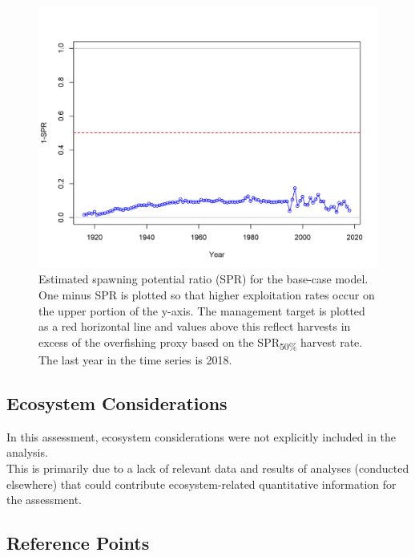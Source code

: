 \documentclass[12pt,]{article}
\begin{document}
\begin{figure}
\centering
\includegraphics{r4ss/plots_mod1/SPR2_minusSPRseries.png}
\caption{Estimated spawning potential ratio (SPR) for the base-case
model. One minus SPR is plotted so that higher exploitation rates occur
on the upper portion of the y-axis. The management target is plotted as
a red horizontal line and values above this reflect harvests in excess
of the overfishing proxy based on the SPR\textsubscript{50\%} harvest
rate. The last year in the time series is 2018. \label{fig:SPR_all}}
\end{figure}

\FloatBarrier

\hypertarget{ecosystem-considerations}{%
\subsection*{Ecosystem Considerations}\label{ecosystem-considerations}}

In this assessment, ecosystem considerations were not explicitly
included in the analysis.\\
This is primarily due to a lack of relevant data and results of analyses
(conducted elsewhere) that could contribute ecosystem-related
quantitative information for the assessment.

\hypertarget{reference-points}{%
\subsection*{Reference Points}\label{reference-points}}
\end{document}
